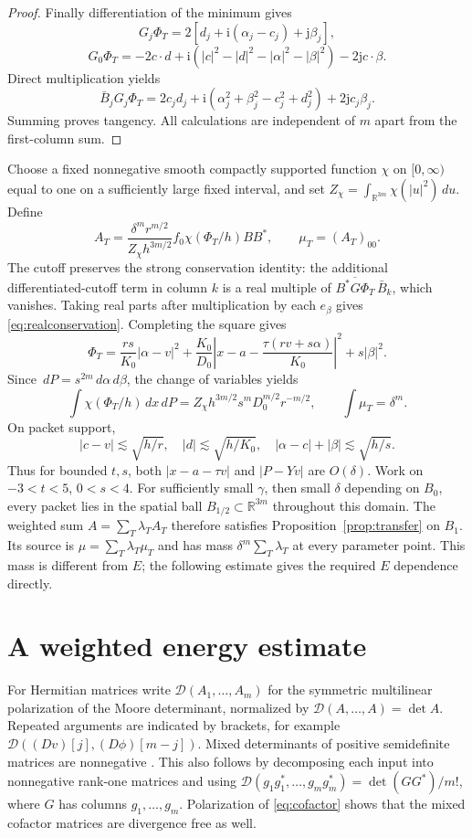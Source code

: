 \documentclass[11pt]{article}
\numberwithin{equation}{section}
\newcommand{\R}{\mathbb R}
\newcommand{\dd}{\,d}
\begin{document}
\begin{proof}
Finally differentiation of the minimum gives
\[
 G_j\Phi_T=2[d_j+\mathrm{i}(\alpha_j-c_j)+\mathrm{j}\beta_j],
\]
\[
 G_0\Phi_T=-2c\cdot d+
 \mathrm{i}(|c|^2-|d|^2-|\alpha|^2-|\beta|^2)-2\mathrm{j} c\cdot\beta.
\]
Direct multiplication yields
\[
 \bar B_jG_j\Phi_T=2c_jd_j+
 \mathrm{i}(\alpha_j^2+\beta_j^2-c_j^2+d_j^2)+2\mathrm{j} c_j\beta_j.
\]
Summing proves tangency. All calculations are independent of $m$
apart from the first-column sum.
\end{proof}

Choose a fixed nonnegative smooth compactly supported function $\chi$
on $[0,\infty)$ equal to one on a sufficiently large fixed interval,
and set $Z_\chi=\int_{\R^{3m}}\chi(|u|^2)\dd u$. Define
\begin{equation}\label{eq:normalizedpacket}
 A_T=\frac{\delta^m r^{m/2}}{Z_\chi h^{3m/2}}
       f_0\chi(\Phi_T/h)BB^*,\qquad \mu_T=(A_T)_{00}.
\end{equation}
The cutoff preserves the strong conservation identity:
the additional differentiated-cutoff term in column $k$ is a real
multiple of
$\overline{B^*G\Phi_T}\,\bar B_k$, which vanishes.
Taking real parts after multiplication by each $e_\beta$ gives
\eqref{eq:realconservation}. Completing the square gives
\[
 \Phi_T=\frac{rs}{K_0}|\alpha-v|^2
 +\frac{K_0}{D_0}\left|x-a-\frac{\tau(rv+s\alpha)}{K_0}\right|^2
 +s|\beta|^2.
\]
Since $\dd P=s^{2m}\dd\alpha\dd\beta$, the change of variables yields
\[
 \int\chi(\Phi_T/h)\dd x\dd P
   =Z_\chi h^{3m/2}s^mD_0^{m/2}r^{-m/2},\qquad
 \int\mu_T=\delta^m.
\]
On packet support,
\[
 |c-v|\lesssim\sqrt{h/r},\quad |d|\lesssim\sqrt{h/K_0},\quad
 |\alpha-c|+|\beta|\lesssim\sqrt{h/s}.
\]
Thus for bounded $t,s$, both $|x-a-\tau v|$ and $|P-Yv|$ are
$O(\delta)$. Work on $-3<t<5$, $0<s<4$. For sufficiently small
$\gamma$, then small $\delta$ depending on $B_0$, every packet lies
in the spatial ball $B_{1/2}\subset\R^{3m}$ throughout this domain.
The weighted sum $A=\sum_T\lambda_TA_T$ therefore satisfies
Proposition~\ref{prop:transfer} on $B_1$. Its source is
$\mu=\sum_T\lambda_T\mu_T$ and has mass
$\delta^m\sum_T\lambda_T$ at every parameter point. This mass is
different from $E$; the following estimate gives the required $E$
dependence directly.

\section{A weighted energy estimate}

For Hermitian matrices write
$\mathcal D(A_1,\ldots,A_m)$ for the symmetric multilinear
polarization of the Moore determinant, normalized by
$\mathcal D(A,\ldots,A)=\det A$.
Repeated arguments are indicated by brackets, for example
$\mathcal D((Dv)[j],(D\phi)[m-j])$.
Mixed determinants of positive semidefinite matrices are nonnegative
\cite[Lemma 2.38]{MZ}. This also follows by decomposing each input
into nonnegative rank-one matrices and using
$\mathcal D(g_1g_1^*,\ldots,g_mg_m^*)=\det(GG^*)/m!$,
where $G$ has columns $g_1,\ldots,g_m$.
Polarization of \eqref{eq:cofactor} shows that the mixed cofactor
matrices are divergence free as well.
\end{document}
